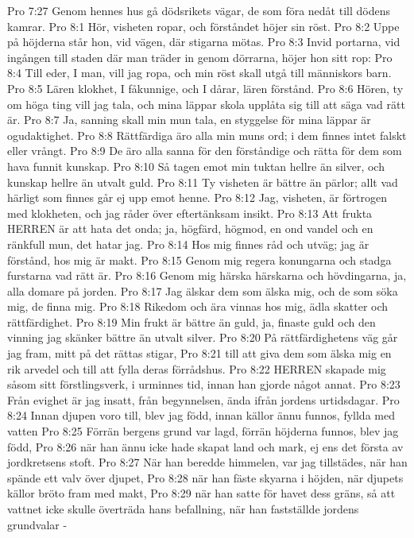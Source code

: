 Pro 7:27  Genom hennes hus gå dödsrikets vägar, de som föra nedåt till dödens kamrar.
Pro 8:1  Hör, visheten ropar, och förståndet höjer sin röst.
Pro 8:2  Uppe på höjderna står hon, vid vägen, där stigarna mötas.
Pro 8:3  Invid portarna, vid ingången till staden där man träder in genom dörrarna, höjer hon sitt rop:
Pro 8:4  Till eder, I man, vill jag ropa, och min röst skall utgå till människors barn.
Pro 8:5  Lären klokhet, I fåkunnige, och I dårar, lären förstånd.
Pro 8:6  Hören, ty om höga ting vill jag tala, och mina läppar skola upplåta sig till att säga vad rätt är.
Pro 8:7  Ja, sanning skall min mun tala, en styggelse för mina läppar är ogudaktighet.
Pro 8:8  Rättfärdiga äro alla min muns ord; i dem finnes intet falskt eller vrångt.
Pro 8:9  De äro alla sanna för den förståndige och rätta för dem som hava funnit kunskap.
Pro 8:10  Så tagen emot min tuktan hellre än silver, och kunskap hellre än utvalt guld.
Pro 8:11  Ty visheten är bättre än pärlor; allt vad härligt som finnes går ej upp emot henne.
Pro 8:12  Jag, visheten, är förtrogen med klokheten, och jag råder över eftertänksam insikt.
Pro 8:13  Att frukta HERREN är att hata det onda; ja, högfärd, högmod, en ond vandel och en ränkfull mun, det hatar jag.
Pro 8:14  Hos mig finnes råd och utväg; jag är förstånd, hos mig är makt.
Pro 8:15  Genom mig regera konungarna och stadga furstarna vad rätt är.
Pro 8:16  Genom mig härska härskarna och hövdingarna, ja, alla domare på jorden.
Pro 8:17  Jag älskar dem som älska mig, och de som söka mig, de finna mig.
Pro 8:18  Rikedom och ära vinnas hos mig, ädla skatter och rättfärdighet.
Pro 8:19  Min frukt är bättre än guld, ja, finaste guld och den vinning jag skänker bättre än utvalt silver.
Pro 8:20  På rättfärdighetens väg går jag fram, mitt på det rättas stigar,
Pro 8:21  till att giva dem som älska mig en rik arvedel och till att fylla deras förrådshus.
Pro 8:22  HERREN skapade mig såsom sitt förstlingsverk, i urminnes tid, innan han gjorde något annat.
Pro 8:23  Från evighet är jag insatt, från begynnelsen, ända ifrån jordens urtidsdagar.
Pro 8:24  Innan djupen voro till, blev jag född, innan källor ännu funnos, fyllda med vatten
Pro 8:25  Förrän bergens grund var lagd, förrän höjderna funnos, blev jag född,
Pro 8:26  när han ännu icke hade skapat land och mark, ej ens det första av jordkretsens stoft.
Pro 8:27  När han beredde himmelen, var jag tillstädes, när han spände ett valv över djupet,
Pro 8:28  när han fäste skyarna i höjden, när djupets källor bröto fram med makt,
Pro 8:29  när han satte för havet dess gräns, så att vattnet icke skulle överträda hans befallning, när han fastställde jordens grundvalar -

